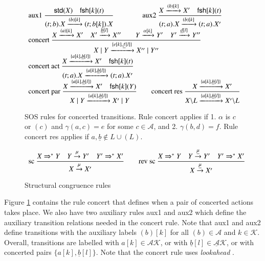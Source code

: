 \documentclass[review]{elsarticle}
\newcommand{\paral}{\; \vert \;}
\newcommand{\Rule}[2]{\displaystyle{\frac{#1}{#2}}}
\newcommand{\tran}[1]{\stackrel{#1}{\rightarrow}}
\newcommand{\mA}{\mathcal{A}}
\newcommand{\mAK}{\mathcal{AK}}
\newcommand{\umAK}{\underline{\mathcal{A}}\mathcal{K}}
\newcommand{\rom}[1]{\mbox{\rm{#1}}}
\newcommand{\std}[1]{\mathsf{std}(#1)}
\newcommand{\Keys}{\mathcal{K}}
\newcommand{\fresh}[2]{\mathsf{fsh}[#1](#2)}
\begin{document}
\begin{figure}[t] 
\[
\begin{array}{l}
\rom{aux1}\ 
\Rule{\std{X} \quad \fresh{k}{t}}
{(t;b).X \xrightarrow{(b)[k]}(t;b[k]).X}
\qquad\qquad
\rom{aux2}\
\Rule
{X \xrightarrow{(b)[k]} X' \quad \fresh{k}{t}}
{(t;a).X \xrightarrow{(b)[k]} (t;a).X'}
\\
\rom{concert}\ 
\Rule
{X\xrightarrow{(a)[k]}X' \quad X'\xrightarrow{\underline{b}[l]}X'' \qquad Y\xrightarrow{\alpha[k]}Y' 
  \quad Y'\xrightarrow{\underline{d}[l]}Y''%
 }
{X \paral Y\xrightarrow{\{e[k],\underline{f}[l]\}} X'' \paral Y''}\\%
\rom{concert act}\
\Rule
{X \xrightarrow{\{{a}[k], \underline{b}[l]\}} X' \quad \fresh{k}{t}}
{(t;a).X \xrightarrow{\{{a}[k], \underline{b}[l]\}} (t;a).X'}\\%
\rom{concert par}\
\Rule
{X \xrightarrow{\{{a}[k], \underline{b}[l]\}} X'\quad \fresh{k}{Y}}
{X \paral Y \xrightarrow{\{{a}[k], \underline{b}[l]\}} X' \paral Y}\qquad
\rom{concert res}\
\Rule
{X \xrightarrow{\{{a}[k], \underline{b}[l]\}} X'}
{X\backslash L \xrightarrow{\{{a}[k], \underline{b}[l]\}} X'\backslash L}
%
\end{array}
\] 
\caption{SOS rules for concerted transitions. Rule concert applies if 1. $\alpha$ is $c$ or $(c)$
and $\gamma(a,c)=e$ for some $c\in \mathcal{A}$, and 2. $\gamma(b,d)=f$. Rule concert res applies
if $a, \underline{b}  \notin L \cup (L)$.}
\label{fig:csos}
\end{figure}

\begin{figure}[t] 
\[
\begin{array}{l}
\rom{sc}\
\Rule
{X \Rightarrow^* Y \quad Y \tran{\mu} Y' \quad Y' \Rightarrow^* X'}
{X\tran{\mu} X'} \qquad 
%
\rom{rev sc}\
\Rule
{X \Rightarrow^* Y \quad Y \tran{\underline{\mu}} Y' \quad Y' \Rightarrow^* X'}
{X\tran{\underline{\mu}} X'} \quad 
\end{array}
\] 
\caption{Structural congruence rules} \label{fig:sc}
\end{figure}
\renewcommand{\arraystretch}{1}

Figure \ref{fig:csos} contains the rule concert that defines when a pair of concerted actions 
takes place. We also have two auxiliary rules aux1 and aux2 which define the auxiliary 
transition relations needed in the concert rule. Note that aux1 and aux2 define transitions 
with the auxiliary labels $(b)[k]$ for all $(b) \in \mA$ and $k \in \Keys$.  Overall, 
transitions are labelled with $a[k] \in \mAK$, or with $\underline{b}[l] \in \umAK$, or with 
concerted pairs $\{a[k], \underline{b}[l]\}$.
Note that the concert rule uses \emph{lookahead} \cite{Uli92}.
\end{document}
